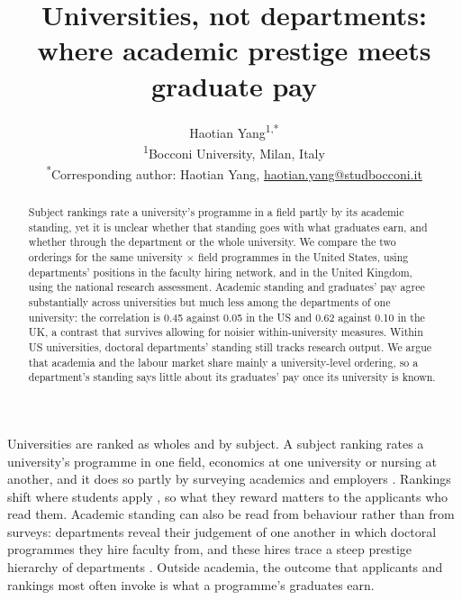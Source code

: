 \documentclass[11pt]{article}
\title{\bfseries Universities, not departments: where academic prestige meets graduate pay}
\author{Haotian Yang\textsuperscript{1,*}\\[6pt]
\small \textsuperscript{1}Bocconi University, Milan, Italy\\
\small \textsuperscript{*}Corresponding author: Haotian Yang, \href{mailto:haotian.yang@studbocconi.it}{haotian.yang@studbocconi.it}}
\date{}
\begin{document}
\maketitle
\linenumbers

\begin{abstract}
\noindent Subject rankings rate a university's programme in a field partly by its academic standing, yet it is unclear
whether that standing goes with what graduates earn, and whether through the department or the whole university. We
compare the two orderings for the same university $\times$ field programmes in the United States, using departments'
positions in the faculty hiring network, and in the United Kingdom, using the national research assessment. Academic
standing and graduates' pay agree substantially across universities but much less among the departments of one
university: the correlation is 0.45 against 0.05 in the US and 0.62 against 0.10 in the UK, a contrast that survives
allowing for noisier within-university measures. Within US universities, doctoral departments' standing still tracks
research output. We argue that academia and the labour market share mainly a university-level ordering, so a
department's standing says little about its graduates' pay once its university is known.
\end{abstract}

\medskip

Universities are ranked as wholes and by subject. A subject ranking rates a university's programme in one field,
economics at one university or nursing at another, and it does so partly by surveying academics and employers
\citep{qs_subject}. Rankings shift where students apply \citep{luca2013salience}, so what they reward matters to the
applicants who read them. Academic standing can also be read from behaviour rather than from surveys: departments
reveal their judgement of one another in which doctoral programmes they hire faculty from, and these hires trace a
steep prestige hierarchy of departments \citep{clauset2015systematic, wapman2022quantifying}. Outside academia, the
outcome that applicants and rankings most often invoke is what a programme's graduates earn.
\end{document}
